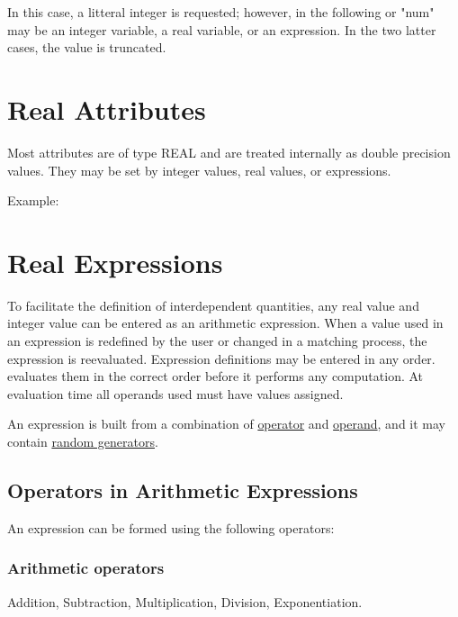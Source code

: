 In this case, a litteral integer is requested; however, in the following 
or 
"num" may be an integer variable, a real variable, or an expression.  In
the two latter cases, the value is truncated. 


\section{Real Attributes}
\label{sec:real}
Most attributes are of type REAL and are treated internally as double
precision values. They may be set by integer values, real values,  or
expressions. 

Example:  


%
\section{Real Expressions}
\label{sec:expression}
To facilitate the definition of interdependent quantities, any real
value and integer value can be entered as an arithmetic expression. When
a value used in an expression is redefined by the user or changed in a
matching process, the expression is reevaluated. Expression definitions
may be entered in any order. \madx evaluates them in the correct order
before it performs any computation. At evaluation time all operands used
must have values assigned.  

An expression is built from a combination of
\hyperref[subsec:operator]{operator} and \hyperref[subsec:operand]{operand}, and it
may contain \hyperref[subsubsec:random]{random generators}.   

\subsection{Operators in Arithmetic Expressions}
\label{subsec:operator}
An expression can be formed using the following operators: 

\subsubsection{Arithmetic operators}
\begin{madlist}
  \ttitem{+} Addition, 
  \ttitem{-} Subtraction, 
  \ttitem{*} Multiplication, 
  \ttitem{/} Division, 
  \ttitem{\^\ } Exponentiation. 
\end{madlist}

